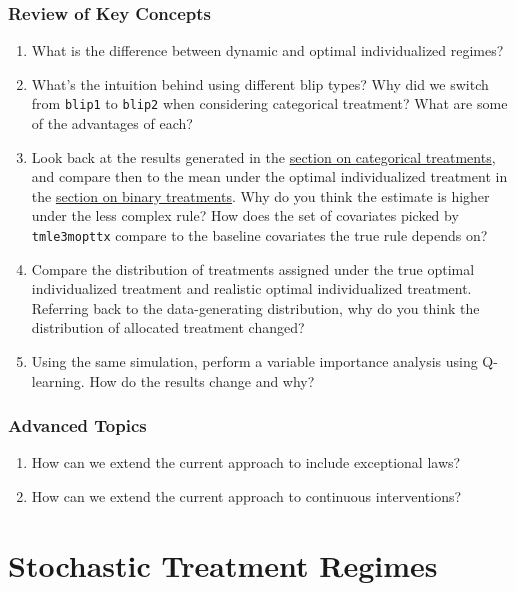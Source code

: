 \documentclass[12pt, krantz2,]{krantz}
\theoremstyle{definition}
\theoremstyle{definition}
\theoremstyle{definition}
\newcommand{\1}{\mathbbm{1}}
\begin{document}
\hypertarget{review-of-key-concepts-1}{%
\subsubsection{Review of Key Concepts}\label{review-of-key-concepts-1}}

\begin{enumerate}
\def\labelenumi{\arabic{enumi}.}
\item
  What is the difference between dynamic and optimal individualized regimes?
\item
  What's the intuition behind using different blip types? Why did we switch
  from \texttt{blip1} to \texttt{blip2} when considering categorical treatment? What are some
  of the advantages of each?
\item
  Look back at the results generated in the \protect\hyperlink{oit-eval-cat}{section on categorical
  treatments}, and compare then to the mean under the optimal
  individualized treatment in the \protect\hyperlink{oit-eval-bin}{section on binary
  treatments}. Why do you think the estimate is higher under the
  less complex rule? How does the set of covariates picked by \texttt{tmle3mopttx}
  compare to the baseline covariates the true rule depends on?
\item
  Compare the distribution of treatments assigned under the true optimal
  individualized treatment and realistic optimal individualized treatment.
  Referring back to the data-generating distribution, why do you think the
  distribution of allocated treatment changed?
\item
  Using the same simulation, perform a variable importance analysis using
  Q-learning. How do the results change and why?
\end{enumerate}

\hypertarget{advanced-topics-1}{%
\subsubsection{Advanced Topics}\label{advanced-topics-1}}

\begin{enumerate}
\def\labelenumi{\arabic{enumi}.}
\item
  How can we extend the current approach to include exceptional laws?
\item
  How can we extend the current approach to continuous interventions?
\end{enumerate}

\hypertarget{stochastic-treatment-regimes}{%
\section{Stochastic Treatment Regimes}\label{stochastic-treatment-regimes}}
\end{document}
